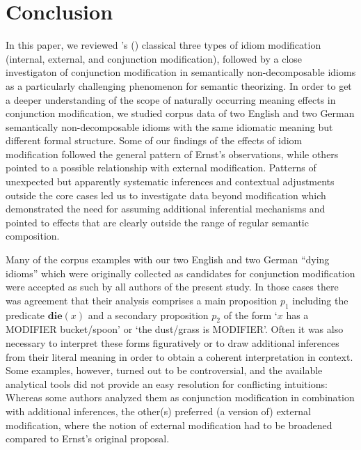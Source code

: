 \documentclass[output=paper]{langsci/langscibook}
\begin{document}
\section{Conclusion} \label{Conclusion} 

In this paper, we reviewed \citeauthor{ernst81}'s (\citeyear{ernst81}) classical three types of idiom modification (internal, external, and conjunction modification), followed by a close investigaton of conjunction modification in semantically non-decomposable idioms as a particularly challenging phenomenon for semantic theorizing. In order to get a deeper understanding of the scope of naturally occurring meaning effects in conjunction modification, we studied corpus data of two English and two German semantically non-decomposable idioms with the same idiomatic meaning but different formal structure. Some of our findings of the effects of idiom modification followed the general pattern of Ernst's observations, while others pointed to a possible relationship with external modification. Patterns of unexpected but apparently systematic inferences and contextual adjustments outside the core cases led us to investigate data beyond modification which demonstrated the need for assuming additional inferential mechanisms and pointed to effects that are clearly outside the range of regular semantic composition.

Many of the corpus examples with our two English and two German ``dying idioms'' which were originally collected as candidates for conjunction modification were accepted as such by all authors of the present study. In those cases there was agreement that their analysis comprises a main proposition $p_{1}$ including the predicate $\textbf{die}(x)$ and a secondary proposition $p_{2}$ of the form `$x$ has a MODIFIER bucket/spoon' or `the dust/grass is MODIFIER'. Often it was also necessary to interpret these forms figuratively or to draw additional inferences from their literal meaning in order to obtain a coherent interpretation in context. Some examples, however, turned out to be controversial, and the available analytical tools did not provide an easy resolution for conflicting intuitions: Whereas some authors analyzed them as conjunction modification in combination with additional inferences, the other(s) preferred (a version of) external modification, where the notion of external modification had to be broadened compared to Ernst's original proposal.
\end{document}

